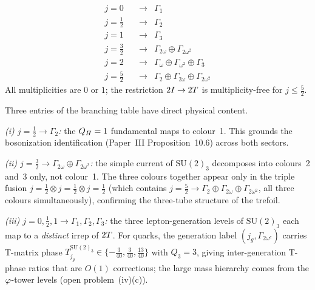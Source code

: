 \begin{proposition}
\label{P15:prop:branching}
\begin{equation}
\renewcommand{\arraystretch}{1.3}
\begin{array}{rll}
  j=0\phantom{/2}& \to & \Gamma_1 \\
  j=\tfrac12 & \to & \Gamma_2 \\
  j=1\phantom{/2} & \to & \Gamma_3 \\
  j=\tfrac32 & \to & \Gamma_{2\omega}\oplus\Gamma_{2\omega^2} \\
  j=2\phantom{/2} & \to & \Gamma_\omega\oplus\Gamma_{\omega^2}\oplus\Gamma_3 \\
  j=\tfrac52 & \to & \Gamma_2\oplus\Gamma_{2\omega}\oplus\Gamma_{2\omega^2}
\end{array}
\label{P15:eq:branching_table_P15}
\end{equation}
All multiplicities are $0$ or $1$; the restriction $2I\to2T$ is
multiplicity-free for $j\le\tfrac52$.
\end{proposition}

\begin{remark}
\label{P15:rem:branching_key_features}
Three entries of the branching table have direct physical content.

\emph{(i) $j=\tfrac12\to\Gamma_2$:} the $Q_H=1$ fundamental maps to
colour~1. This grounds the bosonization identification (Paper~III
Proposition~10.6) across both sectors.

\emph{(ii) $j=\tfrac32\to\Gamma_{2\omega}\oplus\Gamma_{2\omega^2}$:}
the simple current of $\mathrm{SU}(2)_3$ decomposes into
colours~2 and~3 only, not colour~1.
The three colours together appear only in the triple fusion
$j=\tfrac12\otimes j=\tfrac12\otimes j=\tfrac12$
(which contains $j=\tfrac52\to\Gamma_2\oplus\Gamma_{2\omega}\oplus\Gamma_{2\omega^2}$,
all three colours simultaneously), confirming the three-tube structure of the trefoil.

\emph{(iii) $j=0,\tfrac12,1\to\Gamma_1,\Gamma_2,\Gamma_3$:}
the three lepton-generation levels of $\mathrm{SU}(2)_3$
each map to a \emph{distinct} irrep of $2T$.
For quarks, the generation label $(j_g,\Gamma_{2\omega^c})$ carries
T-matrix phase $T_{j_g}^{\mathrm{SU}(2)_3}\in\{-\tfrac{3}{40},\tfrac{3}{40},\tfrac{13}{40}\}$
with $Q_3=3$, giving inter-generation T-phase ratios that are $O(1)$ corrections;
the large mass hierarchy comes from the $\varphi$-tower levels (open problem~(iv)(c)).
\end{remark}

